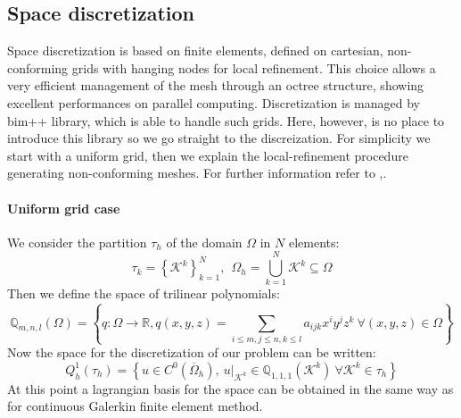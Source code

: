 \documentclass[11pt,a4paper]{article}
\begin{document}
\subsection{Space discretization}
Space discretization is based on finite elements, defined on cartesian, non-conforming grids with hanging nodes for local refinement. This choice allows a very efficient management of the mesh through an octree structure, showing excellent performances on parallel computing.
Discretization is managed by bim++ library, which is able to handle such grids. Here, however, is no place to introduce this library so we go straight to the discreization. For simplicity we start with a uniform grid, then we explain the local-refinement procedure generating non-conforming meshes. For further information refer to \cite{africa2022scalable},\cite{thesis-pasquale-africa}. 
\paragraph{Uniform grid case}
We consider the partition \(\tau_h\) of the domain \(\Omega\) in \(N\) elements:
\begin{equation}
	\tau_k=\left\{\mathcal{K}^k\right\}_{k=1}^N,\ \ \Omega_h=\bigcup_{k=1}^N \mathcal{K}^k \subseteq \Omega
\end{equation}
Then we define the space of trilinear polynomials:
\begin{equation}
	\mathbb{Q}_{m,n,l}(\Omega)=\left\{q:\Omega\rightarrow\mathbb{R}, q(x,y,z)=\sum_{i\leq m,j\leq n,k\leq l}a_{ijk}x^iy^jz^k\ \forall (x,y,z)\in\Omega \right\}
\end{equation}
Now the space for the discretization of our problem can be written:
\begin{equation}
	Q_h^1(\tau_h) = \left\{u\in C^0\left(\overline{\Omega}_h\right),\ u|_{\mathcal{K}^k}\in\mathbb{Q}_{1,1,1}\left(\mathcal{K}^k\right)\ \forall \mathcal{K}^k\in \tau_h \right\}
\end{equation}
At this point a lagrangian basis for the space can be obtained in the same way as for continuous Galerkin finite element method.
\end{document}
